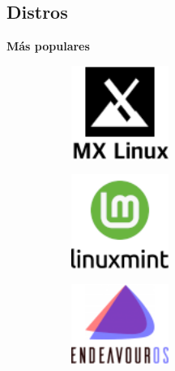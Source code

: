 \documentclass[aspectratio=43]{beamer}
\begin{document}
    \subsection{Distros}
    \begin{frame}{\secname}{\subsecname}
        \textbf{Más populares}
        \begin{figure}[b]
            \centering
            \begin{subfigure}{.3\textwidth}
                \centering
                \includegraphics[width=0.35\textwidth]{img/mx.png}
            \end{subfigure}
            \begin{subfigure}{.3\textwidth}
                \centering
                \includegraphics[width=0.35\textwidth]{img/mint.png}
            \end{subfigure}
            \begin{subfigure}{.3\textwidth}
                \centering
                \includegraphics[width=0.35\textwidth]{img/endeavour.png}
            \end{subfigure}
            \centering
            \begin{subfigure}{.3\textwidth}

\end{subfigure}
\end{figure}
\end{frame}
\end{document}
